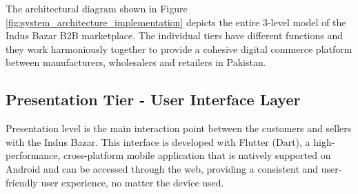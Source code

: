 The architectural diagram shown in Figure \ref{fig:system_architecture_implementation} depicts the entire 3-level model of the Indus Bazar B2B marketplace. The individual tiers have different functions and they work harmoniously together to provide a cohesive digital commerce platform between manufacturers, wholesalers and retailers in Pakistan.

\subsection{Presentation Tier - User Interface Layer}
Presentation level is the main interaction point between the customers and sellers with the Indus Bazar. This interface is developed with Flutter (Dart), a high-performance, cross-platform mobile application that is natively supported on Android and can be accessed through the web, providing a consistent and user-friendly user experience, no matter the device used.

